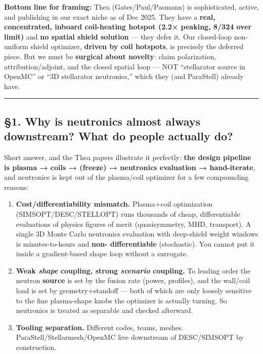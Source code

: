 \documentclass[
]{article}
\providecommand{\tightlist}{%
  \setlength{\itemsep}{0pt}\setlength{\parskip}{0pt}}
\begin{document}
\textbf{Bottom line for framing:} Thea (Gates/Paul/Pasmann) is
sophisticated, active, and publishing in our exact niche as of Dec 2025.
They have a \textbf{real, concentrated, inboard coil-heating hotspot
(2.2× peaking, 8/324 over limit)} and \textbf{no spatial shield
solution} --- they defer it. Our closed-loop non-uniform shield
optimizer, \textbf{driven by coil hotspots}, is precisely the deferred
piece. But we must be \textbf{surgical about novelty}: claim
polarization, attribution/adjoint, and the closed spatial loop --- NOT
``stellarator source in OpenMC'' or ``3D stellarator neutronics,'' which
they (and ParaStell) already have.

\begin{center}\rule{0.5\linewidth}{0.5pt}\end{center}

\subsection{§1. Why is neutronics almost always downstream? What do
people actually
do?}\label{why-is-neutronics-almost-always-downstream-what-do-people-actually-do}

Short answer, and the Thea papers illustrate it perfectly: \textbf{the
design pipeline is plasma → coils → (freeze) → neutronics evaluation →
hand-iterate}, and neutronics is kept out of the plasma/coil optimizer
for a few compounding reasons:

\begin{enumerate}
\def\labelenumi{\arabic{enumi}.}
\tightlist
\item
  \textbf{Cost/differentiability mismatch.} Plasma+coil optimization
  (SIMSOPT/DESC/STELLOPT) runs thousands of cheap, differentiable
  evaluations of physics figures of merit (quasisymmetry, MHD,
  transport). A single 3D Monte Carlo neutronics evaluation with
  deep-shield weight windows is minutes-to-hours and \textbf{non-
  differentiable} (stochastic). You cannot put it inside a
  gradient-based shape loop without a surrogate.
\item
  \textbf{Weak \emph{shape} coupling, strong \emph{scenario} coupling.}
  To leading order the neutron \textbf{source} is set by the fusion rate
  (power, profiles), and the wall/coil load is set by geometry+standoff
  --- both of which are only loosely sensitive to the fine plasma-shape
  knobs the optimizer is actually turning. So neutronics is treated as
  separable and checked afterward.
\item
  \textbf{Tooling separation.} Different codes, teams, meshes.
  ParaStell/Stellarmesh/OpenMC live downstream of DESC/SIMSOPT by
  construction.
\end{enumerate}
\end{document}
